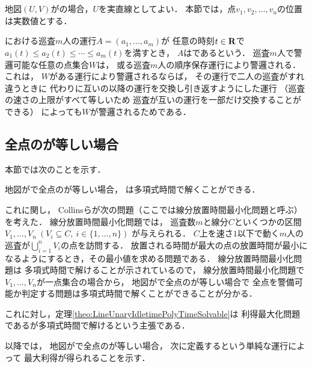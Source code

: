\chapter{{\graphLine}}
\label{chapter: line}

地図$(U, V)$が{\graphLine}の場合，$U$を実直線としてよい．
本節では，点$v_1, v_2, \ldots, v_n$の位置は実数値とする．

{\graphLine}における巡査$m$人の運行$A = (a_1, \ldots, a_m)$が
任意の時刻$t \in \mathbf R$で
$a_1(t) \leq a_2(t) \leq \cdots \leq a_m(t)$を満すとき，
$A$はであるという．
巡査$m$人で警邏可能な任意の点集合$W$は，
或る巡査$m$人の順序保存運行により警邏される．
これは，
$W$がある運行により警邏されるならば，
その運行で二人の巡査がすれ違うときに
代わりに互いの以降の運行を交換し引き返すようにした運行
（巡査の速さの上限がすべて等しいため
巡査が互いの運行を一部だけ交換することができる）
によっても$W$が警邏されるためである．


\section{全点の{\maxIdletime}が等しい場合}
\label{subsec:LineUnaryIdletimePolyTimeSolvable}


本節では次のことを示す．

\begin{theo}
  \label{theo:LineUnaryIdletimePolyTimeSolvable}
  地図が{\graphLine}で全点の{\maxIdletime}が等しい場合，
  {\patProb}は多項式時間で解くことができる．
\end{theo}

これに関し，
Collinsら\cite{collins2013optimal}が次の問題（ここでは線分放置時間最小化問題と呼ぶ）を考えた．
線分放置時間最小化問題では，
巡査数$m$と線分$C$といくつかの区間
$V_1, \ldots, V_n\ (V_i \subseteq C,\ i \in \{1,\ldots, n\})$%
が与えられる．
$C$上を速さ$1$以下で動く$m$人の巡査が$\bigcup_{i = 1}^n V_i$の点を訪問する．
放置される時間が最大の点の放置時間が最小になるようにするとき，その最小値を求める問題である．
線分放置時間最小化問題は
多項式時間で解けることが示されている\cite[Theorem 2.1]{collins2013optimal}ので，
線分放置時間最小化問題で$V_1, \ldots, V_n$が一点集合の場合から，
地図が{\graphLine}で全点の{\maxIdletime}が等しい場合で
全点を警備可能か判定する問題は多項式時間で解くことができることが分かる．

これに対し，定理\ref{theo:LineUnaryIdletimePolyTimeSolvable}は
利得最大化問題である{\patProb}が多項式時間で解けるという主張である．

以降では，
地図が{\graphLine}で全点の{\maxIdletime}が等しい場合，
次に定義するという単純な運行によって
最大利得が得られることを示す．

